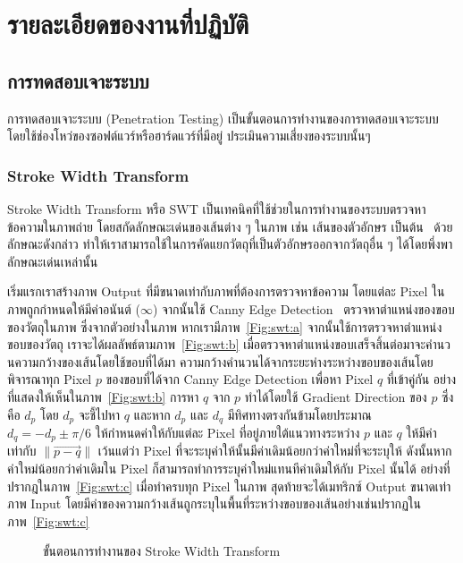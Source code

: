 \chapter{รายละเอียดของงานที่ปฏิบัติ}
\label{chapter:related-theory}

\section{การทดสอบเจาะระบบ}

การทดสอบเจาะระบบ (Penetration Testing) เป็นขั้นตอนการทำงานของการทดสอบเจาะระบบ โดยใช้ช่องโหว่ของซอฟต์แวร์หรือฮาร์ดแวร์ที่มีอยู่ ประเมินความเสี่ยงของระบบนั้นๆ

\subsection{Stroke Width Transform}

Stroke Width Transform หรือ SWT เป็นเทคนิคที่ใช้ช่วยในการทำงานของระบบตรวจหาข้อความในภาพถ่าย โดยสกัดลักษณะเด่นของเส้นต่าง ๆ ในภาพ เช่น เส้นของตัวอักษร เป็นต้น~\cite{5540041} ด้วยลักษณะดังกล่าว ทำให้เราสามารถใช้ในการคัดแยกวัตถุที่เป็นตัวอักษรออกจากวัตถุอื่น ๆ ได้โดยพึ่งพาลักษณะเด่นเหล่านั้น

เริ่มแรกเราสร้างภาพ Output ที่มีขนาดเท่ากับภาพที่ต้องการตรวจหาข้อความ โดยแต่ละ Pixel ในภาพถูกกำหนดให้มีค่าอนันต์ ($\infty$) จากนั้นใช้ Canny Edge Detection~\cite{4767851} ตรวจหาตำแหน่งของขอบของวัตถุในภาพ ซึ่งจากตัวอย่างในภาพ หากเรามีภาพ~\ref{Fig:swt:a} จากนั้นใช้การตรวจหาตำแหน่งขอบของวัตถุ เราจะได้ผลลัพธ์ตามภาพ~\ref{Fig:swt:b} เมื่อตรวจหาตำแหน่งขอบเสร็จสิ้นต่อมาจะคำนวนความกว้างของเส้นโดยใช้ขอบที่ได้มา ความกว้างคำนวนได้จากระยะห่างระหว่างขอบของเส้นโดยพิจารณาทุก Pixel $p$ ของขอบที่ได้จาก Canny Edge Detection เพื่อหา Pixel $q$ ที่เข้าคู่กัน อย่างที่แสดงให้เห็นในภาพ~\ref{Fig:swt:b} การหา $q$ จาก $p$ ทำได้โดยใช้ Gradient Direction ของ $p$ ซึ่งคือ $d_p$ โดย $d_p$ จะชี้ไปหา $q$ และหาก $d_p$ และ $d_q$ มีทิศทางตรงกันข้ามโดยประมาณ $d_q = -d_p \pm \pi/6$ ให้กำหนดค่าให้กับแต่ละ Pixel ที่อยู่ภายใต้แนวทางระหว่าง $p$ และ $q$ ให้มีค่าเท่ากับ $\| \overrightarrow{p-q}\|$ เว้นแต่ว่า Pixel ที่จะระบุค่าให้นั้นมีค่าเดิมน้อยกว่าค่าใหม่ที่จะระบุให้ ดังนั้นหากค่าใหม่น้อยกว่าค่าเดิมใน Pixel ก็สามารถทำการระบุค่าใหม่แทนทีค่าเดิมให้กับ Pixel นั้นได้ อย่างที่ปรากฎในภาพ~\ref{Fig:swt:c} เมื่อทำครบทุก Pixel ในภาพ สุดท้ายจะได้เมทริกซ์ Output ขนาดเท่าภาพ Input โดยมีค่าของความกว้างเส้นถูกระบุในพื้นที่ระหว่างขอบของเส้นอย่างเช่นปรากฏในภาพ~\ref{Fig:swt:c}

\begin{figure}[!h]
    \centering
    \caption{ขั้นตอนการทำงานของ Stroke Width Transform}
    \label{Fig:swt}
\end{figure}

